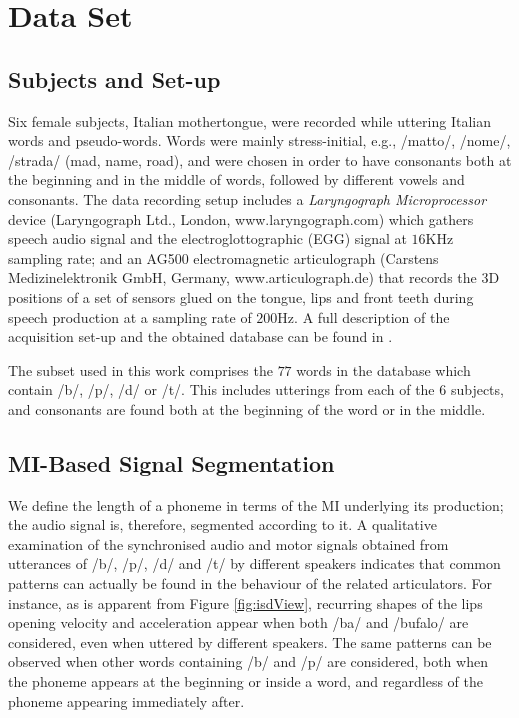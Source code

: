 \section{Data Set}
\label{sec:dataset}

\subsection{Subjects and Set-up}
\label{subsec:setup}

Six female subjects, Italian mothertongue, were recorded while uttering
Italian words and pseudo-words. Words were mainly stress-initial, e.g.,
/matto/, /nome/, /strada/ (mad, name, road), and were chosen in order
to have consonants both at the beginning and in the middle of
words, followed by different vowels and consonants.
The data recording setup includes a \emph{Laryngograph Microprocessor}
device (Laryngograph Ltd., London, www.laryngograph.com) which gathers speech audio
signal and the electroglottographic (EGG) signal at $16$KHz sampling
rate; and an AG500 electromagnetic articulograph (Carstens Medizinelektronik
GmbH, Germany, www.articulograph.de) that records the
3D positions of a set of sensors glued on the tongue, lips and front teeth
during speech production at a sampling rate of $200$Hz. A full description of the 
acquisition set-up and the obtained database can be found in \cite{tavella}.

The subset used in this work comprises the $77$ words in the database
which contain /b/, /p/, /d/ or /t/. This includes utterings from each of the
$6$ subjects, and consonants are found both at the beginning of the word or
in the middle.

\subsection{MI-Based Signal Segmentation}
\label{subsec:segm}

We define the length of a phoneme in terms of the MI underlying its production;
the audio signal is, therefore, segmented according to it.
A qualitative examination of the synchronised audio and motor
signals obtained from utterances of /b/, /p/, /d/ and /t/
by different speakers indicates that common patterns can
actually be found in the behaviour of the related articulators.
For instance, as is apparent from Figure \ref{fig:isdView}, 
recurring shapes of the lips opening velocity and acceleration appear
when both /ba/ and /bufalo/ are considered, even when uttered by different
speakers. The same patterns can be observed when other words containing
/b/ and /p/ are considered, both when the phoneme appears at the beginning
or inside a word, and regardless of the phoneme appearing immediately after.

